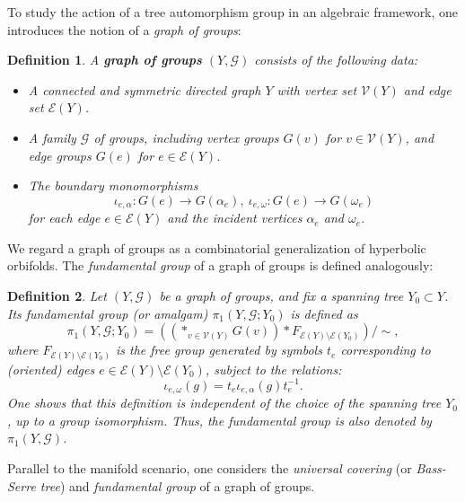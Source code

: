 \documentclass[12pt,leqno]{amsart}
\newcommand{\2}{L^2_{\rm per}(0, T)}
\newtheorem{defn}{Definition}[section]
\numberwithin{equation}{section}
\numberwithin{figure}{section}
\begin{document}
To study the action of a tree automorphism group in an algebraic framework, one introduces the notion of a \emph{graph of groups}\cite{dicks2006groups}:
\begin{defn}
    A \textbf{graph of groups} $(Y,\mathcal{G})$ consists of the following data:
    \begin{itemize}
        \item A connected and symmetric directed graph $Y$ with vertex set $\mathcal{V}(Y)$ and edge set $\mathcal{E}(Y)$.
        \item A family $\mathcal{G}$ of groups, including \emph{vertex groups} $G(v)$ for $v\in\mathcal{V}(Y)$, and \emph{edge groups} $G(e)$ for $e\in\mathcal{E}(Y)$.
        \item The \emph{boundary monomorphisms}
        \[
        \iota_{e,\alpha}: G(e)\to G(\alpha_e),\ \iota_{e,\omega}: G(e)\to G(\omega_e)
        \]
        for each edge $e\in\mathcal{E}(Y)$ and the incident vertices $\alpha_e$ and $\omega_e$.
    \end{itemize}
\end{defn}
We regard a graph of groups as a combinatorial generalization of hyperbolic orbifolds. The \emph{fundamental group} of a graph of groups is defined analogously:
\begin{defn}
    Let $(Y,\mathcal{G})$ be a graph of groups, and fix a spanning tree $Y_0\subset Y$. Its \emph{fundamental group} (or \emph{amalgam}) $\pi_1(Y,\mathcal{G};Y_0)$ is defined as
    \[
    \pi_1(Y,\mathcal{G};Y_0) = \left(\left(\ast_{v\in\mathcal{V}(Y)}G(v)\right)\ast F_{\mathcal{E}(Y)\setminus\mathcal{E}(Y_0)}\right)/\sim,
    \]
    where $F_{\mathcal{E}(Y)\setminus\mathcal{E}(Y_0)}$ is the free group generated by symbols $t_e$ corresponding to (oriented) edges $e\in \mathcal{E}(Y)\setminus\mathcal{E}(Y_0)$, subject to the relations:
    \[
    \iota_{e,\omega}(g) = t_e\iota_{e,\alpha}(g)t_e^{-1}.
    \] 
    One shows that this definition is independent of the choice of the spanning tree $Y_0$, up to a group isomorphism. Thus, the fundamental group is also denoted by $\pi_1(Y,\mathcal{G})$.
\end{defn}
Parallel to the manifold scenario, one considers the \emph{universal covering} (or \emph{Bass-Serre tree}) and \emph{fundamental group} of a graph of groups.
\end{document}
